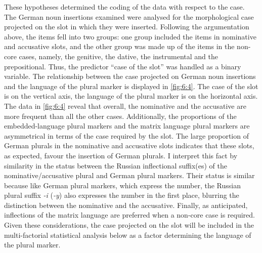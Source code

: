 These hypotheses determined the coding of the data with respect to the case. The German noun insertions examined were analysed for the morphological case projected on the slot in which they were inserted. Following the argumentation above, the items fell into two groups: one group included the items in nominative and accusative slots, and the other group was made up of the items in the non-core cases, namely, the genitive, the dative, the instrumental and the prepositional. Thus, the predictor “case of the slot” was handled as a binary variable. The relationship between the case projected on German noun insertions and the language of the plural marker is displayed in \ref{fig:6:4}. The case of the slot is on the vertical axis, the language of the plural marker is on the horizontal axis. The data in \ref{fig:6:4} reveal that overall, the nominative and the accusative are more frequent than all the other cases. Additionally, the proportions of the embedded-language plural markers and the matrix language plural markers are asymmetrical in terms of the case required by the slot. The large proportion of German plurals in the nominative and accusative slots indicates that these slots, as expected, favour the insertion of German plurals. I interpret this fact by similarity in the status between the Russian inflectional suffix(es) of the nominative/accusative plural and German plural markers. Their status is similar because like German plural markers, which express the number, the Russian plural suffix \textit{-i} (\textit{-y}) also expresses the number in the first place, blurring the distinction between the nominative and the accusative. Finally, as anticipated, inflections of the matrix language are preferred when a non-core case is required. Given these considerations, the case projected on the slot will be included in the multi-factorial statistical analysis below as a factor determining the language of the plural marker.

